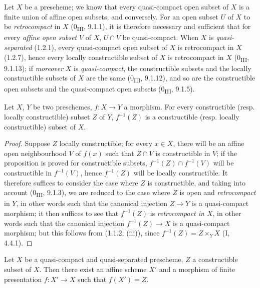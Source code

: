 
\begin{env}[1.8.1]
\label{IV.1.8.1}
Let $X$ be a prescheme; we know that every quasi-compact open subset of $X$
is a finite union of affine open subsets, and conversely. For an open subset
$U$ of $X$ to be \emph{retrocompact} in $X$ (0\textsubscript{III}, 9.1.1), it
is therefore necessary and sufficient that for every \emph{affine open subset}
$V$ of $X$, $U\cap V$ be quasi-compact. When $X$ is \emph{quasi-separated}
(1.2.1), every quasi-compact open subset of $X$ is retrocompact in $X$
(1.2.7), hence every locally constructible subset of $X$ is retrocompact in
$X$ (0\textsubscript{III}, 9.1.13); if \emph{moreover} $X$ is
\emph{quasi-compact}, the constructible subsets and the locally constructible
subsets of $X$ are the same (0\textsubscript{III}, 9.1.12), and so are the
constructible open subsets and the quasi-compact open subsets
(0\textsubscript{III}, 9.1.5).
\end{env}

\begin{proposition}[1.8.2]
\label{IV.1.8.2}
Let $X$, $Y$ be two preschemes, $f:X\to Y$ a morphism. For every
constructible (resp. locally constructible) subset $Z$ of $Y$, $f^{-1}(Z)$ is
a constructible (resp. locally constructible) subset of $X$.
\end{proposition}

\begin{proof}
Suppose $Z$ locally constructible; for every $x\in X$, there will be an
affine open neighbourhood $V$ of $f(x)$ such that $Z\cap V$ is constructible
in $V$; if the proposition is proved for constructible subsets,
$f^{-1}(Z)\cap f^{-1}(V)$ will be constructible in $f^{-1}(V)$, hence
$f^{-1}(Z)$ will be locally constructible. It therefore suffices to consider
the case where $Z$ is constructible, and taking into account
(0\textsubscript{III}, 9.1.3), we are reduced to the case where $Z$ is open
and \emph{retrocompact} in $Y$, in other words such that the canonical
injection $Z\to Y$ is a quasi-compact morphism; it then suffices to see that
$f^{-1}(Z)$ is \emph{retrocompact in $X$}, in other words such that the
canonical injection $f^{-1}(Z)\to X$ is a quasi-compact morphism; but this
follows from (1.1.2, (iii)), since $f^{-1}(Z)=Z\times_YX$ (I, 4.4.1).
\end{proof}

\begin{lemma}[1.8.3]
\label{IV.1.8.3}
Let $X$ be a quasi-compact and quasi-separated prescheme, $Z$ a
constructible subset of $X$. Then there exist an affine scheme $X'$ and a
morphism of finite presentation $f:X'\to X$ such that $f(X')=Z$.
\end{lemma}

